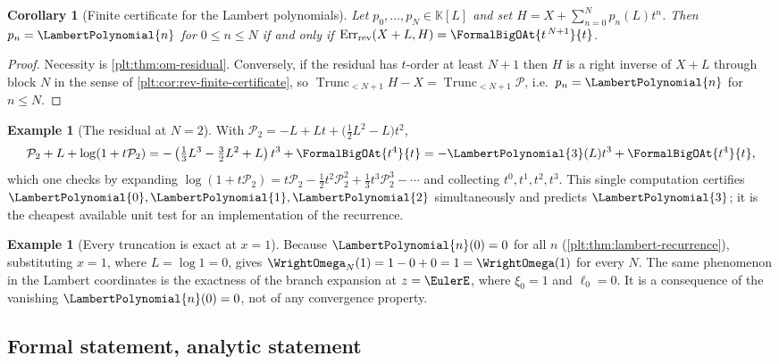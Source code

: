 \documentclass[11pt,oneside]{article}
\theoremstyle{plain}
\newtheorem{corollary}[theorem]{Corollary}
\theoremstyle{definition}
\newtheorem{example}[theorem]{Example}
\theoremstyle{remark}
\newcommand{\K}{\mathbb{K}}
\newcommand{\Trunc}[2]{\operatorname{Trunc}_{<#2}#1}     %
\newcommand{\LamP}[1]{\LambertPolynomial{#1}}
\newcommand{\RevErr}[2]{\operatorname{Err}_{\mathrm{rev}}\!\left(#1,#2\right)}
\begin{document}
\begin{corollary}[Finite certificate for the Lambert polynomials]
\label{plt:cor:om-certificate}
Let \(p_0,\ldots,p_N\in\K[L]\) and set
\(H=X+\sum_{n=0}^{N}p_n(L)t^{n}\).  Then \(p_n=\LamP{n}\) for
\(0\le n\le N\) if and only if
\(\RevErr{X+L}{H}=\FormalBigOAt{t^{\,N+1}}{t}\).
\end{corollary}

\begin{proof}
Necessity is \cref{plt:thm:om-residual}.  Conversely, if the residual has
\(t\)-order at least \(N+1\) then \(H\) is a right inverse of \(X+L\) through
block \(N\) in the sense of \cref{plt:cor:rev-finite-certificate}, so
\(\Trunc{H-X}{N+1}=\Trunc{\mathcal P}{N+1}\), i.e.\ \(p_n=\LamP{n}\) for
\(n\le N\).
\end{proof}

\begin{example}[The residual at \(N=2\)]
\label{plt:ex:om-residual-2}
With \(\mathcal P_2=-L+Lt+\bigl(\tfrac12L^{2}-L\bigr)t^{2}\),
\[
 \mathcal P_2+L+\log(1+t\mathcal P_2)
 =-\left(\tfrac13L^{3}-\tfrac32L^{2}+L\right)t^{3}+\FormalBigOAt{t^{4}}{t}
 =-\LamP{3}(L)t^{3}+\FormalBigOAt{t^{4}}{t},
\]
which one checks by expanding
\(\log(1+t\mathcal P_2)=t\mathcal P_2-\tfrac12t^{2}\mathcal P_2^{2}+\tfrac13t^{3}\mathcal P_2^{3}-\cdots\)
and collecting \(t^{0},t^{1},t^{2},t^{3}\).  This single computation
certifies \(\LamP{0},\LamP{1},\LamP{2}\) simultaneously and predicts
\(\LamP{3}\); it is the cheapest available unit test for an implementation of
the recurrence.
\end{example}

\begin{example}[Every truncation is exact at \(x=1\)]
\label{plt:ex:om-exact-at-one}
Because \(\LamP{n}(0)=0\) for all \(n\) (\cref{plt:thm:lambert-recurrence}),
substituting \(x=1\), where \(L=\log1=0\), gives
\(\WrightOmega_N(1)=1-0+0=1=\WrightOmega(1)\) for every \(N\).  The same
phenomenon in the Lambert coordinates is the exactness of the branch
expansion at \(z=\EulerE\), where \(\xi_0=1\) and \(\ell_0=0\).  It is a
consequence of the vanishing \(\LamP{n}(0)=0\), not of any convergence
property.
\end{example}

\subsection{Formal statement, analytic statement}
\label{plt:sec:om-analytic}
\end{document}
